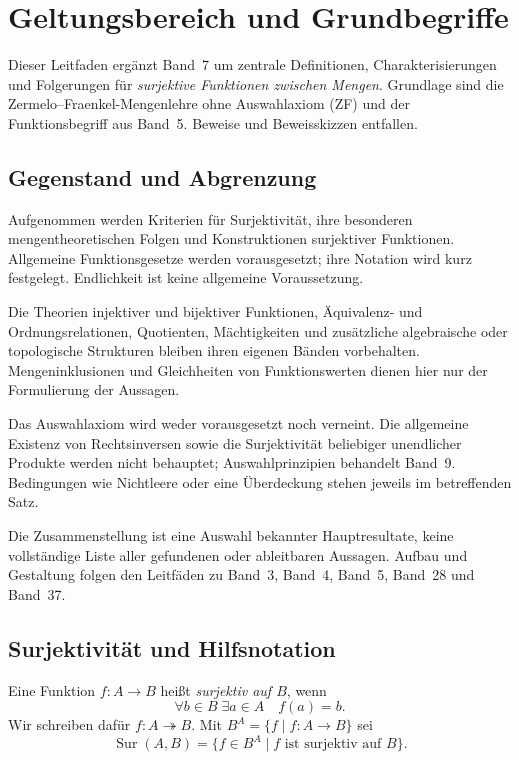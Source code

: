 \chapter{Geltungsbereich und Grundbegriffe}

Dieser Leitfaden ergänzt Band~7 um zentrale Definitionen,
Charakterisierungen und Folgerungen für \emph{surjektive Funktionen
zwischen Mengen}. Grundlage sind die Zermelo--Fraenkel-Mengenlehre
ohne Auswahlaxiom (ZF) und der Funktionsbegriff aus Band~5.
Beweise und Beweisskizzen entfallen.

\section{Gegenstand und Abgrenzung}

Aufgenommen werden Kriterien für Surjektivität, ihre besonderen
mengentheoretischen Folgen und Konstruktionen surjektiver Funktionen.
Allgemeine Funktionsgesetze werden vorausgesetzt; ihre Notation
wird kurz festgelegt. Endlichkeit ist keine allgemeine Voraussetzung.

Die Theorien injektiver und bijektiver Funktionen, Äquivalenz- und
Ordnungsrelationen, Quotienten, Mächtigkeiten und zusätzliche
algebraische oder topologische Strukturen bleiben ihren eigenen
Bänden vorbehalten. Mengeninklusionen und Gleichheiten von
Funktionswerten dienen hier nur der Formulierung der Aussagen.

Das Auswahlaxiom wird weder vorausgesetzt noch verneint.
Die allgemeine Existenz von Rechtsinversen sowie die Surjektivität
beliebiger unendlicher Produkte werden nicht behauptet;
Auswahlprinzipien behandelt Band~9.
Bedingungen wie Nichtleere oder eine Überdeckung stehen jeweils
im betreffenden Satz.

Die Zusammenstellung ist eine Auswahl bekannter Hauptresultate,
keine vollständige Liste aller gefundenen oder ableitbaren Aussagen.
Aufbau und Gestaltung folgen den Leitfäden zu Band~3, Band~4,
Band~5, Band~28 und Band~37.
\section{Surjektivität und Hilfsnotation}

\begin{definition}
\label{b07guide:def:surjection}
Eine Funktion $f\colon A\to B$ heißt \emph{surjektiv auf $B$}, wenn
\[
 \forall b\in B\;\exists a\in A\quad f(a)=b.
\]
Wir schreiben dafür $f\colon A\twoheadrightarrow B$.
Mit $B^A=\{f\mid f\colon A\to B\}$ sei
\[
 \operatorname{Sur}(A,B)
   =\{f\in B^A\mid f\text{ ist surjektiv auf }B\}.
\]
\end{definition}

